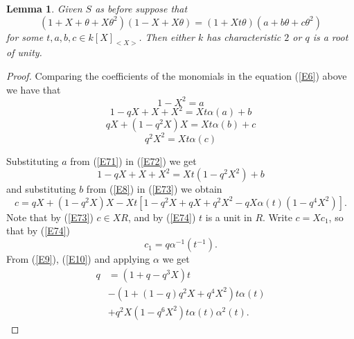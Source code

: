 \documentclass[a4paper, 11pt]{article}
\newtheorem{lemma}[theorem]{Lemma}
\theoremstyle{definition}
\begin{document}
\begin{lemma}\label{q algebraic} Given $S$ as before suppose that
 \begin{equation}\label{E6}
(1+X+\theta+X\theta^2)(1-X+X\theta)=(1+Xt\theta)(a+b\theta+c\theta^2)
\end{equation}
for some  $t, a,b,c \in k[X]_{<X>}$. Then either $k$ has characteristic $2$ or $q$ is a root of unity.
\end{lemma}
\begin{proof}
Comparing the coefficients of the monomials in the equation (\ref{E6}) above we have that
\begin{equation}\label{E71}
1-X^2=a
\end{equation}
\begin{equation}\label{E72}
1-qX+X+X^2=Xt\alpha(a)+b
\end{equation}
\begin{equation}\label{E73}
qX+(1-q^2X)X=Xt\alpha(b)+c
\end{equation}
\begin{equation}\label{E74}
q^2X^2=Xt\alpha(c)
\end{equation}

Substituting $a$ from (\ref{E71}) in (\ref{E72}) we get
\begin{equation}	\label{E8}
1-qX+X+X^2=Xt(1-q^2X^2)+b
\end{equation}
and substituting $b$ from (\ref{E8}) in  (\ref{E73}) we obtain
\begin{equation}\label{E9}
c=qX+(1-q^2X)X-Xt[1-q^2X+qX+q^2X^2-qX\alpha(t)(1-q^4X^2)].
\end{equation}
Note that by (\ref{E73}) $c\in XR$, and by (\ref{E74}) $t$ is a unit in $R$. Write $c=Xc_1$, so that by (\ref{E74})
\begin{equation}\label{E10}
c_1=q\alpha^{-1}(t^{-1}).
\end{equation}
From (\ref{E9}), (\ref{E10}) and applying $\alpha$ we get
\begin{equation}\label{reduced}
\begin{split}
q&=(1+q-q^3X)t\\&-(1+(1-q)q^2X+q^4X^2)t\alpha(t)\\&+q^2X(1-q^6X^2)t\alpha(t)\alpha^2(t).
\end{split}
\end{equation}


\end{proof}
\end{document}
